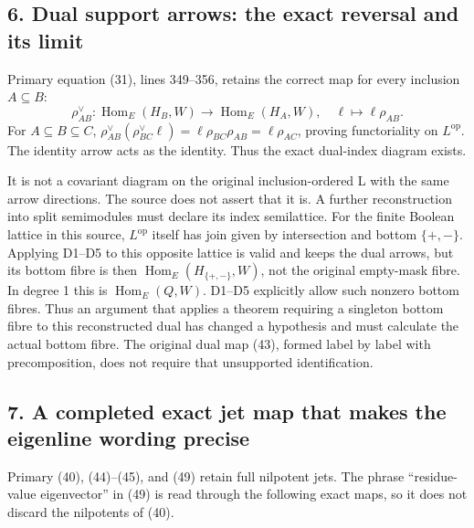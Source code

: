 \documentclass[10pt,a4paper,oneside]{report}
\begin{document}
\subsection{6. Dual support arrows: the exact reversal and its limit}\label{proof01:source-maps-dual-support-arrows-the-exact-reversal-and-its-limit}

Primary equation (31), lines 349--356, retains the correct map for every inclusion \(A\subseteq B\): \[
\rho_{AB}^{\vee}:\operatorname{Hom}_E(H_B,W)
\longrightarrow\operatorname{Hom}_E(H_A,W),\quad
\ell\longmapsto\ell\rho_{AB}.
\] For \(A\subseteq B\subseteq C\), \(\rho_{AB}^{\vee}(\rho_{BC}^{\vee}\ell)=\ell\rho_{BC}\rho_{AB}=\ell\rho_{AC}\), proving functoriality on \(L^{\mathrm{op}}\). The identity arrow acts as the identity. Thus the exact dual-index diagram exists.

It is not a covariant diagram on the original inclusion-ordered L with the same arrow directions. The source does not assert that it is. A further reconstruction into split semimodules must declare its index semilattice. For the finite Boolean lattice in this source, \(L^{\mathrm{op}}\) itself has join given by intersection and bottom \(\{+,-\}\). Applying D1--D5 to this opposite lattice is valid and keeps the dual arrows, but its bottom fibre is then \(\operatorname{Hom}_E(H_{\{+,-\}},W)\), not the original empty-mask fibre. In degree 1 this is \(\operatorname{Hom}_E(Q,W)\). D1--D5 explicitly allow such nonzero bottom fibres. Thus an argument that applies a theorem requiring a singleton bottom fibre to this reconstructed dual has changed a hypothesis and must calculate the actual bottom fibre. The original dual map (43), formed label by label with precomposition, does not require that unsupported identification.

\subsection{7. A completed exact jet map that makes the eigenline wording precise}\label{proof01:source-maps-a-completed-exact-jet-map-that-makes-the-eigenline-wording-precise}

Primary (40), (44)--(45), and (49) retain full nilpotent jets. The phrase ``residue-value eigenvector'' in (49) is read through the following exact maps, so it does not discard the nilpotents of (40).
\end{document}
